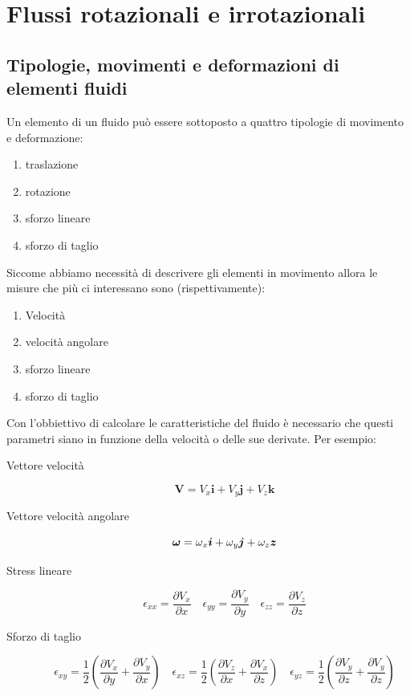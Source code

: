 \chapter{Flussi rotazionali e irrotazionali}\label{chp:RotIrrotFlow}
\section{Tipologie, movimenti e deformazioni di elementi fluidi}
Un elemento di un fluido può essere sottoposto a quattro tipologie di movimento e deformazione:
\begin{enumerate}
\item traslazione
\item rotazione
\item sforzo lineare
\item sforzo di taglio
\end{enumerate}
Siccome abbiamo necessità di descrivere gli elementi in movimento allora le misure che più ci interessano sono (rispettivamente):
\begin{enumerate}
\item Velocità
\item velocità angolare
\item sforzo lineare
\item sforzo di taglio
\end{enumerate}
Con l'obbiettivo di calcolare le caratteristiche del fluido è necessario che questi parametri siano in funzione della velocità o delle sue derivate.
Per esempio:
\begin{description}
\item[Vettore velocità]
\begin{equation}
\mathbf{V} = V_x \mathbf{i} + V_y \mathbf{j} + V_z \mathbf{k}
\end{equation}
\item[Vettore velocità angolare]
\begin{equation}
\vec{\omega} = \omega_x \vec{i} + \omega_y \vec{j} + \omega_z \vec{z}\\
\end{equation}
\item[Stress lineare]
\begin{equation}
\epsilon_{xx} = \frac{\partial V_x}{\partial x} \quad \epsilon_{yy} = \frac{\partial V_y}{\partial y} \quad \epsilon_{zz} = \frac{\partial V_z}{\partial z}
\end{equation}
\item[Sforzo di taglio]
\begin{equation}
\epsilon_{xy} = \frac{1}{2}\left(\frac{\partial V_x}{\partial y} + \frac{\partial V_y}{\partial x}\right) \quad \epsilon_{xz} = \frac{1}{2}\left(\frac{\partial V_z}{\partial x} + \frac{\partial V_x}{\partial z}\right) \quad \epsilon_{yz} = \frac{1}{2}\left(\frac{\partial V_y}{\partial z} + \frac{\partial V_y}{\partial z}\right)
\end{equation}
\end{description}
